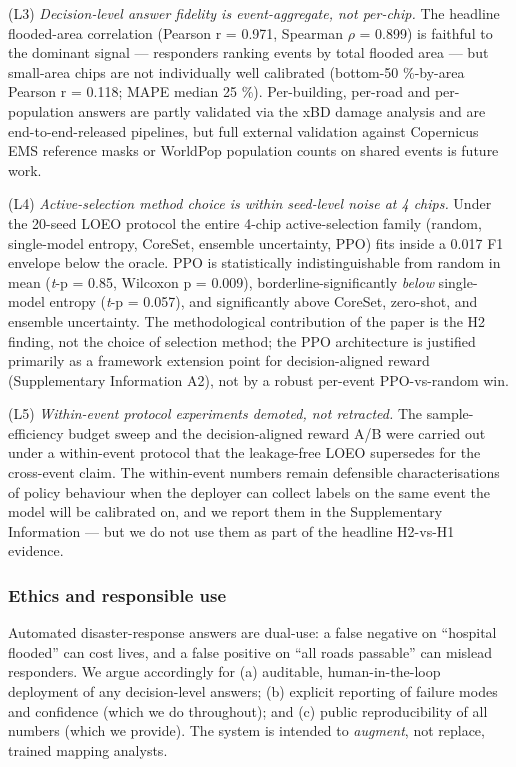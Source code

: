 \documentclass[sn-nature,lineno]{sn-jnl}
\theoremstyle{thmstyleone}
\theoremstyle{thmstyletwo}
\theoremstyle{thmstylethree}
\begin{document}
(L3) \emph{Decision-level answer fidelity is event-aggregate, not per-chip.}
The headline flooded-area correlation (Pearson r = 0.971, Spearman $\rho$ =
0.899) is faithful to the dominant signal --- responders ranking events
by total flooded area --- but small-area chips are not individually well
calibrated (bottom-50 \%-by-area Pearson r = 0.118; MAPE median 25 \%).
Per-building, per-road and per-population answers are partly validated
via the xBD damage analysis and are end-to-end-released pipelines, but
full external validation against Copernicus EMS reference masks or
WorldPop \cite{worldpop2024} population counts on shared events is future work.

(L4) \emph{Active-selection method choice is within seed-level noise at
4 chips.} Under the 20-seed LOEO protocol the entire 4-chip
active-selection family (random, single-model entropy, CoreSet,
ensemble uncertainty, PPO) fits inside a 0.017 F1 envelope below the
oracle. PPO is statistically indistinguishable from random in mean
(\emph{t}-p = 0.85, Wilcoxon p = 0.009), borderline-significantly \emph{below}
single-model entropy (\emph{t}-p = 0.057), and significantly above CoreSet,
zero-shot, and ensemble uncertainty. The methodological contribution of
the paper is the H2 finding, not the choice of selection method; the
PPO architecture is justified primarily as a framework extension point
for decision-aligned reward (Supplementary Information A2), not by a
robust per-event PPO-vs-random win.

(L5) \emph{Within-event protocol experiments demoted, not retracted.} The
sample-efficiency budget sweep and the decision-aligned reward A/B
were carried out under a within-event protocol that the leakage-free
LOEO supersedes for the cross-event claim. The within-event numbers
remain defensible characterisations of policy behaviour when the
deployer can collect labels on the same event the model will be
calibrated on, and we report them in the Supplementary Information ---
but we do not use them as part of the headline H2-vs-H1 evidence.

\subsubsection{Ethics and responsible use}\label{ethics-and-responsible-use}

Automated disaster-response answers are dual-use: a false negative on
``hospital flooded'' can cost lives, and a false positive on ``all roads
passable'' can mislead responders. We argue accordingly for (a) auditable,
human-in-the-loop deployment of any decision-level answers; (b) explicit
reporting of failure modes and confidence (which we do throughout); and
(c) public reproducibility of all numbers (which we provide). The system is
intended to \emph{augment}, not replace, trained mapping analysts.
\end{document}
